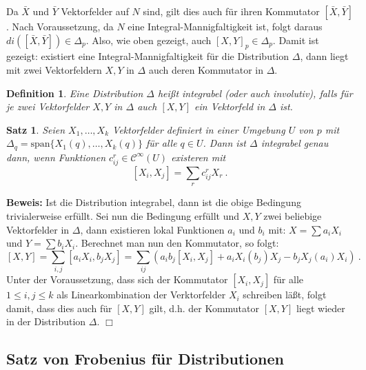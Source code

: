 \documentclass[12pt,a4paper]{article}
\newtheorem{Satz}[Lemma]{Satz}
\newtheorem{Definition}[Lemma]{Definition}
\def\proof{\noindent\textbf{Beweis:}\quad}
\def\qed{\quad\hfill\ensuremath{\Box}}
\begin{document}
Da $\bar X$ und $\bar Y$ Vektorfelder auf $N$ sind, gilt dies auch f\"ur
ihren Kommutator $[\bar X, \bar Y]$. Nach Voraussetzung, da $N$ eine
Integral-Mannigfaltigkeit ist, folgt daraus $di ([\bar X, \bar Y])\in \Delta_p$.
Also, wie oben gezeigt, auch $[X, Y]_p \in \Delta_p$. Damit ist gezeigt:
existiert eine Integral-Mannigfaltigkeit f\"ur die Distribution $\Delta$,
dann liegt mit zwei Vektorfeldern $X, Y$ in $\Delta$ auch deren Kommutator
in $\Delta$.

\bigskip

\begin{Definition}
Eine Distribution $\Delta$ hei\ss t {\em integrabel} (oder auch involutiv), falls
f\"ur je zwei Vektorfelder $X,Y$ in $\Delta$ auch $[X, Y]$ ein Vektorfeld in $\Delta$
ist.
\end{Definition}

\bigskip

\begin{Satz}
Seien $X_1, \ldots, X_k$ Vektorfelder definiert in einer Umgebung $U$ von $p$
 mit $\Delta_q = \mathrm{span} \{X_1(q), \ldots, X_k(q)\}$ f\"ur alle $q\in U$.
 Dann ist $\Delta$ integrabel genau dann, wenn Funktionen
 $c_{ij}^r \in \mathcal C^\infty(U)$ existeren mit
 $$
 [X_i, X_j] = \sum_r c_{ij}^r X_r \ .
 $$
\end{Satz}
\proof
Ist die Distribution integrabel, dann ist die obige Bedingung trivialerweise erf\"ullt. Sei nun die
Bedingung erf\"ullt und $X, Y$ zwei beliebige Vektorfelder in $\Delta$, dann existieren lokal
Funktionen $a_i$ und $b_i$ mit: $X=\sum a_i X_i$ und $Y=\sum b_i X_i$. Berechnet man nun den
Kommutator, so folgt:
$$
[X, Y] = \sum_{i,j} [a_i X_i, b_j X_j] = \sum_{ij} ( a_i b_j [X_i, X_j] + a_i X_i(b_j) X_j - b_j X_j(a_i) X_i )\ .
$$
Unter der Voraussetzung, dass sich der Kommutator $[X_i, X_j]$ f\"ur alle $1\le i,j \le k$ als Linearkombination
der Verktorfelder $X_i$ schreiben l\"a\ss t, folgt damit, dass dies auch f\"ur $[X, Y]$ gilt, d.h. der
Kommutator $[X, Y]$ liegt wieder in der Distribution $\Delta$.
\qed

\bigskip

\subsection{Satz von Frobenius f\"ur Distributionen}
\end{document}
